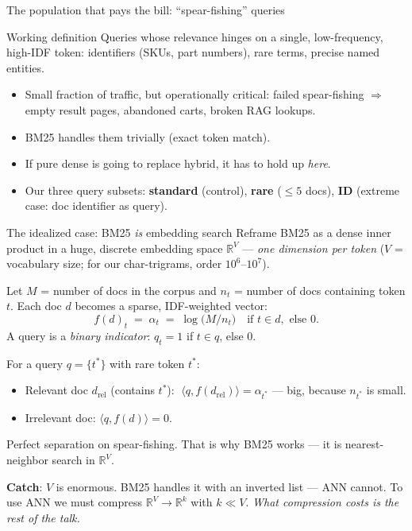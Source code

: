 \begin{frame}{The population that pays the bill: ``spear-fishing'' queries}
  \begin{block}{Working definition}
    Queries whose relevance hinges on a single, low-frequency, high-IDF token:
    identifiers (SKUs, part numbers), rare terms, precise named entities.
  \end{block}

  \begin{itemize}
    \item Small fraction of traffic, but operationally critical:
          failed spear-fishing $\Rightarrow$ empty result pages, abandoned carts,
          broken RAG lookups.
    \item BM25 handles them trivially (exact token match).
    \item If pure dense is going to replace hybrid, it has to hold up \emph{here}.
    \item Our three query subsets: \textbf{standard} (control),
          \textbf{rare} ($\le 5$ docs), \textbf{ID} (extreme case: doc identifier
          as query).
  \end{itemize}
\end{frame}

\begin{frame}{The idealized case: BM25 \emph{is} embedding search}
  Reframe BM25 as a dense inner product in a huge, discrete embedding space
  $\mathbb{R}^V$ --- \emph{one dimension per token}
  ($V$ = vocabulary size; for our char-trigrams, order $10^6$--$10^7$).

  \medskip
  Let $M$ = number of docs in the corpus and $n_t$ = number of docs containing
  token $t$. Each doc $d$ becomes a sparse, IDF-weighted vector:
  \[
    f(d)_t \;=\; \alpha_t \;=\; \log\!\big(M / n_t\big)
    \quad\text{if } t \in d, \text{ else } 0.
  \]
  A query is a \emph{binary indicator}: $q_t = 1$ if $t \in q$, else $0$.

  \medskip
  For a query $q = \{t^*\}$ with rare token $t^*$:
  \begin{itemize}
    \item Relevant doc $d_{\text{rel}}$ (contains $t^*$):
          $\;\langle q, f(d_{\text{rel}})\rangle = \alpha_{t^*}$
          --- \alert{big}, because $n_{t^*}$ is small.
    \item Irrelevant doc: $\langle q, f(d)\rangle = 0$.
  \end{itemize}
  \alert{Perfect separation on spear-fishing.} That is why BM25 works ---
  it is nearest-neighbor search in $\mathbb{R}^V$.

  \medskip
  \textbf{Catch}: $V$ is enormous. BM25 handles it with an inverted list ---
  ANN cannot. To use ANN we must compress $\mathbb{R}^V \to \mathbb{R}^k$
  with $k \ll V$. \emph{What compression costs is the rest of the talk.}
\end{frame}

